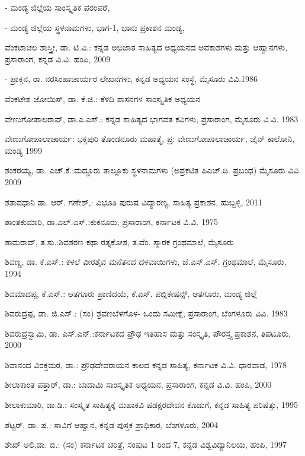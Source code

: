 - ಮಂಡ್ಯ ಜಿಲ್ಲೆಯ ಸಾಂಸ್ಕೃತಿಕ ಪರಂಪರೆ,

- ಮಂಡ್ಯ ಜಿಲ್ಲೆಯ ಸ್ಥಳನಾಮಗಳು, ಭಾಗ-1, ಭಾನು ಪ್ರಕಾಶನ ಮಂಡ್ಯ,

\noindent
ವೆಂಕಟಾಚಲ ಶಾಸ್ತ್ರೀ, ಡಾ. ಟಿ.ವಿ.: ಕನ್ನಡ ಅಭಿಜಾತ ಸಾಹಿತ್ಯದ ಅಧ್ಯಯನದ ಅವಕಾಶಗಳು ಮತ್ತು ಆಹ್ವಾನಗಳು, ಪ್ರಸಾರಾಂಗ, ಕನ್ನಡ ವಿ.ವಿ. ಹಂಪಿ, 2009

- ಪ್ರಾಕ್ತನ, ರಾ. ನರಸಿಂಹಾಚಾರ್ಯರ ಲೇಖನಗಳು, ಕನ್ನಡ ಅಧ್ಯಯನ ಸಂಸ್ಥೆ, ಮೈಸೂರು ವಿವಿ.1986

\noindent
ವೆಂಕಟೇಶ ಜೋಯಿಸ್​, ಡಾ. ಕೆ.ಜಿ.: ಕೆಳದಿ ಶಾಸನಗಳ ಸಾಂಸ್ಕೃತಿಕ ಅಧ್ಯಯನ

\noindent
ವೇಣುಗೋಪಾಲರಾವ್​, ಡಾ.ಎ.ಎಸ್​.: ಕನ್ನಡ ಸಾಹಿತ್ಯದ ಭಾಗವತ ಕವಿಗಳು, ಪ್ರಸಾರಾಂಗ, ಮೈಸೂರು ವಿ.ವಿ. 1983

\noindent
ವೇಣುಗೋಪಾಲಾಚಾರ್ಯ: ಭಕ್ತಪುರಿ ತೊಂಡನೂರು ಮಹಾತ್ಮೆ, ಪ್ರ: ವೇಣುಗೋಪಾಲಾಚಾರ್ಯ, ಜೈನ್​ ಕಾಲೋನಿ, ಮಂಡ್ಯ 1999

\noindent
ಶಂಕರಯ್ಯ, ಡಾ. ಎಚ್​.ಕೆ.:ಮದ್ದೂರು ತಾಲ್ಲೂಕು ಸ್ಥಳನಾಮಗಳು (ಅಪ್ರಕಟಿತ ಪಿಎಚ್​.ಡಿ. ಪ್ರಬಂಧ) ಮೈಸೂರು ವಿವಿ. 2009

\noindent
ಶತಾವಧಾನಿ ಡಾ. ಆರ್​. ಗಣೇಶ್​,: ವಿಭೂತಿ ಪುರುಷ ವಿದ್ಯಾರಣ್ಯ, ಸಾಹಿತ್ಯ ಪ್ರಕಾಶನ, ಹುಬ್ಬಳ್ಳಿ, 2011

\noindent
ಶಾಂತಕುಮಾರಿ, ಡಾ.ಎಲ್​.ಎಸ್​.:ಕುಕನೂರು, ಪ್ರಸಾರಾಂಗ, ಕರ್ನಾಟಕ ವಿ.ವಿ. 1975

\noindent
ಶಾಮರಾವ್​, ತ.ಸು.:ಶಿವಶರಣ ಕಥಾ ರತ್ನಕೋಶ, ತ.ವೆಂ. ಸ್ಮಾರಕ ಗ್ರಂಥಮಾಲೆ, ಮೈಸೂರು

\noindent
ಶಿವಣ್ಣ, ಡಾ. ಕೆ.ಎಸ್​.: ಕಳಲೆ ವೀರಶೈವ ಮನೆತನದ ದಳವಾಯಿಗಳು, ಜೆ.ಎಸ್​.ಎಸ್​. ಗ್ರಂಥಮಾಲೆ, ಮೈಸೂರು, 1994

\noindent
ಶಿವಮಾದಪ್ಪ, ಕೆ.ಎಸ್​.: ಆತಗೂರು ಪ್ರಾಣಿದಯೆ, ಕೆ.ಎಸ್​. ಪಬ್ಲಿಕೇಷನ್ಸ್​, ಆತಗೂರು, ಮಂಡ್ಯ ಜಿಲ್ಲೆ

\noindent
ಶಿವರುದ್ರಪ್ಪ, ಡಾ. ಜಿ.ಎಸ್​.: (ಸಂ) ಶ್ರವಣಬೆಳಗೊಳ- ಒಂದು ಸಮೀಕ್ಷೆ, ಪ್ರಸಾರಾಂಗ, ಬೆಂಗಳೂರು ವಿವಿ. 1983

\noindent
ಶಿವರುದ್ರಸ್ವಾಮಿ, ಡಾ. ಎಸ್​.ಎನ್​.:ಕರ್ನಾಟಕದ ಪ್ರೌಢ ಇತಿಹಾಸ ಮತ್ತು ಸಂಸ್ಕೃತಿ, ಪೌರಸ್ತ್ಯ ಪ್ರಕಾಶನ, ತಿಪಟೂರು, 2000

\noindent
ಶಿವಾನಂದ ವಿರಕ್ತಮಠ, ಡಾ.: ಪ್ರೌಢದೇವರಾಯನ ಕಾಲದ ಕನ್ನಡ ಸಾಹಿತ್ಯ, ಕರ್ನಾಟಕ ವಿ.ವಿ. ಧಾರವಾಡ, 1978

\noindent
ಶೀಲಾಕಾಂತ ಪತ್ತಾರ್​, ಡಾ.: ಬಾದಾಮಿ ಸಾಂಸ್ಕೃತಿಕ ಅಧ್ಯಯನ, ಪ್ರಸಾರಾಂಗ, ಕನ್ನಡ ವಿ.ವಿ. ಹಂಪಿ, 2000

\noindent
ಶೀಲಾಕುಮಾರಿ, ಡಾ.ಡಿ.: ಸಂಸ್ಕೃತ ಸಾಹಿತ್ಯಕ್ಕೆ ಮಹಾಕವಿ ಷಡಕ್ಷರದೇವನ ಕೊಡುಗೆ, ಕನ್ನಡ ಸಾಹಿತ್ಯ ಪರಿಷತ್ತು, 1995

\noindent
ಶೆಟ್ಟರ್​, ಡಾ. ಷ.: ಸಾವಿಗೆ ಆಹ್ವಾನ, ಕನ್ನಡ ಪುಸ್ತಕ ಪ್ರಾಧಿಕಾರ, ಬೆಂಗಳೂರು, 2004

\noindent
ಶೇಖ್​ ಅಲಿ,ಡಾ. ಬಿ.: (ಸಂ) ಕರ್ನಾಟಕ ಚರಿತ್ರೆ, ಸಂಪುಟ 1 ರಿಂದ 7, ಕನ್ನಡ ವಿಶ್ವವಿದ್ಯಾನಿಲಯ, ಹಂಪಿ, 1997

